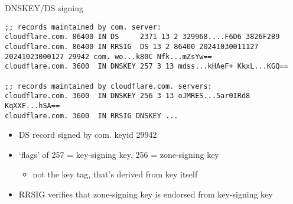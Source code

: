 \begin{frame}[fragile]{DNSKEY/DS signing}
\begin{Verbatim}[fontsize=\fontsize{9}{10}]
;; records maintained by com. server:
cloudflare.com. 86400 IN DS     2371 13 2 329968....F6D6 3826F2B9
cloudflare.com. 86400 IN RRSIG  DS 13 2 86400 20241030011127 20241023000127 29942 com. wo...k80C Nfk...mZsYw==
cloudflare.com. 3600  IN DNSKEY 257 3 13 mdss...kHAeF+ KkxL...KGQ==

;; records maintained by cloudflare.com. servers:
cloudflare.com. 3600  IN DNSKEY 256 3 13 oJMRES...5ar0IRd8 KqXXF...hSA==
cloudflare.com. 3600  IN RRSIG DNSKEY ...
\end{Verbatim}
\begin{itemize}
\item DS record signed by com. keyid 29942
\item `flags' of 257 = key-signing key, 256 = zone-signing key
    \begin{itemize}
    \item not the key tag, that's derived from key itself
    \end{itemize}
\item RRSIG verifies that zone-signing key is endorsed from key-signing key
\end{itemize}
\end{frame}

